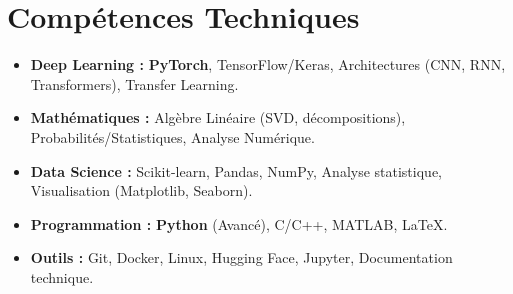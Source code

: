 \documentclass[a4paper,11pt]{article}
\begin{document}
\section{Compétences Techniques}
\begin{itemize}[leftmargin=*, nosep]
    \item \small{\textbf{Deep Learning :} \textbf{PyTorch}, TensorFlow/Keras, Architectures (CNN, RNN, Transformers), Transfer Learning.}
    \item \small{\textbf{Mathématiques :} Algèbre Linéaire (SVD, décompositions), Probabilités/Statistiques, Analyse Numérique.}
    \item \small{\textbf{Data Science :} Scikit-learn, Pandas, NumPy, Analyse statistique, Visualisation (Matplotlib, Seaborn).}
    \item \small{\textbf{Programmation :} \textbf{Python} (Avancé), C/C++, MATLAB, LaTeX.}
    \item \small{\textbf{Outils :} Git, Docker, Linux, Hugging Face, Jupyter, Documentation technique.}
\end{itemize}

\end{document}

